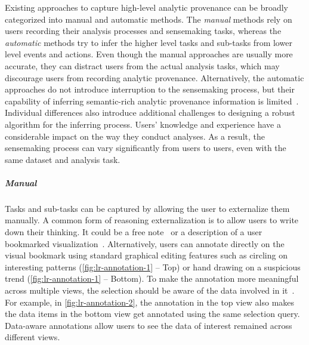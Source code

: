 Existing approaches to capture high-level analytic provenance can be broadly categorized into manual and automatic methods. The \emph{manual} methods rely on users recording their analysis processes and sensemaking tasks, whereas the \emph{automatic} methods try to infer the higher level tasks and sub-tasks from lower level events and actions. Even though the manual approaches are usually more accurate, they can distract users from the actual analysis tasks, which may discourage users from recording analytic provenance. Alternatively, the automatic approaches do not introduce interruption to the sensemaking process, but their capability of inferring semantic-rich analytic provenance information is limited~\cite{Gotz2009}. Individual differences also introduce additional challenges to designing a robust algorithm for the inferring process. Users' knowledge and experience have a considerable impact on the way they conduct analyses. As a result, the sensemaking process can vary significantly from users to users, even with the same dataset and analysis task.

\subparagraph{Manual}

Tasks and sub-tasks can be captured by allowing the user to externalize them manually. A common form of reasoning externalization is to allow users to write down their thinking. It could be a free note~\cite{Shrinivasan2008} or a description of a user bookmarked visualization~\cite{Heer2009,Walker2013}. Alternatively, users can annotate directly on the visual bookmark using standard graphical editing features such as circling on interesting patterns (\autoref{fig:lr-annotation-1} -- Top) or hand drawing on a suspicious trend (\autoref{fig:lr-annotation-1} -- Bottom). To make the annotation more meaningful across multiple views, the selection should be aware of the data involved in it~\cite{Heer2008a}. For example, in \autoref{fig:lr-annotation-2}, the annotation in the top view also makes the data items in the bottom view get annotated using the same selection query. Data-aware annotations allow users to see the data of interest remained across different views.

